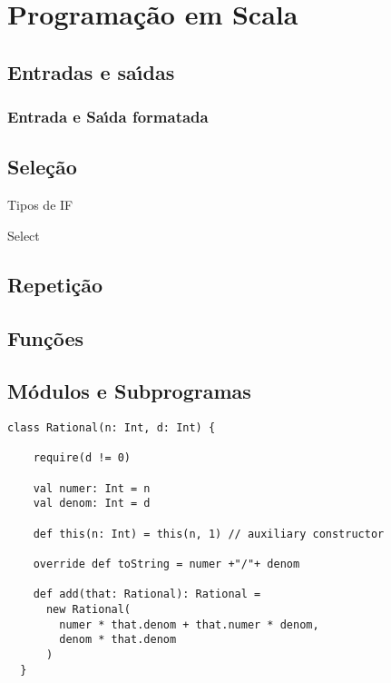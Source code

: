 

\chapter{ Programa\c{c}\~{a}o em Scala}


    \section{Entradas e sa\'{\i}das}

          \subsection{Entrada e Sa\'{\i}da formatada}


    \section{Sele\c{c}\~{a}o}
    Tipos de IF

    Select

    \section{Repeti\c{c}\~{a}o}

    \section{Fun\c{c}\~{o}es}



    \section{M\'{o}dulos e Subprogramas}


   \begin{lstlisting}
class Rational(n: Int, d: Int) {

    require(d != 0)

    val numer: Int = n
    val denom: Int = d

    def this(n: Int) = this(n, 1) // auxiliary constructor

    override def toString = numer +"/"+ denom

    def add(that: Rational): Rational =
      new Rational(
        numer * that.denom + that.numer * denom,
        denom * that.denom
      )
  }
    \end{lstlisting}


